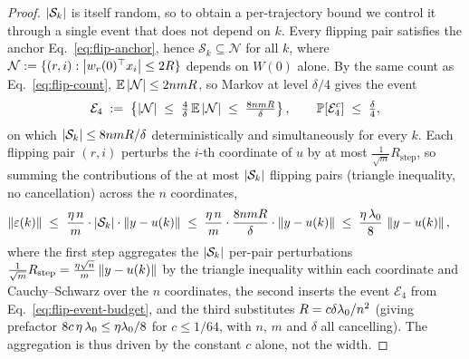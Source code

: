 \begin{proof}
$\left| \mathcal{S}_k \right|$ is itself random, so to obtain a per-trajectory bound we control it
through a single event that does not depend on $k$. Every flipping pair satisfies the
anchor Eq.~\eqref{eq:flip-anchor}, hence $\mathcal{S}_k \subseteq \mathcal{N}$ for all $k$,
where $\mathcal{N} := \{(r,i) : \left| w_r(0)^\top x_i \right| \le 2R\}$ depends on $W(0)$ alone. By
the same count as Eq.~\eqref{eq:flip-count}, $\mathbb{E}\left| \mathcal{N} \right| \le 2nmR$, so Markov at level
$\delta/4$ gives the event
\begin{align}\label{eq:flip-event-budget}
\mathcal{E}_4 \;:=\; \left\{ \left| \mathcal{N} \right| \;\le\; \tfrac{4}{\delta}\,\mathbb{E}\left| \mathcal{N} \right|
\;\le\; \tfrac{8 n m R}{\delta} \right\},
\qquad \mathbb{P}[\mathcal{E}_4^c] \;\le\; \tfrac{\delta}{4},
\end{align}
on which $\left| \mathcal{S}_k \right| \le 8nmR/\delta$ deterministically and simultaneously for every
$k$. Each flipping pair $(r,i)$ perturbs the $i$-th coordinate of $u$ by at most
$\tfrac{1}{\sqrt m}R_{\mathrm{step}}$, so summing the contributions of the at most
$\left| \mathcal{S}_k \right|$ flipping pairs (triangle inequality, no cancellation) across the $n$
coordinates,
\begin{align}\label{eq:remainder}
\left\|  \varepsilon(k)  \right\|
\;\le\; & ~ \frac{\eta\, n}{m} \cdot \left|  \mathcal{S}_k  \right| \cdot \left\| y - u(k) \right\|
\;\le\; \frac{\eta\, n}{m} \cdot \frac{8 n m R}{\delta} \cdot \left\| y - u(k) \right\|
\;\le\; \frac{\eta\, \lambda_{0}}{8}\, \left\|  y - u(k)  \right\|,
\end{align}
where the first step aggregates the $\left| \mathcal{S}_k \right|$ per-pair perturbations
$\tfrac{1}{\sqrt m}R_{\mathrm{step}} = \tfrac{\eta\sqrt n}{m}\left\| y-u(k) \right\|$ by the triangle
inequality within each coordinate and Cauchy--Schwarz over the $n$ coordinates, the second
inserts the event $\mathcal{E}_4$ from Eq.~\eqref{eq:flip-event-budget}, and the third
substitutes $R = c\delta\lambda_{0}/n^2$ (giving prefactor $8 c\,\eta\,\lambda_{0} \le \eta\lambda_{0}/8$ for
$c \le 1/64$, with $n$, $m$ and $\delta$ all cancelling). The aggregation is thus driven by the
constant $c$ alone, not the width.


\end{proof}
